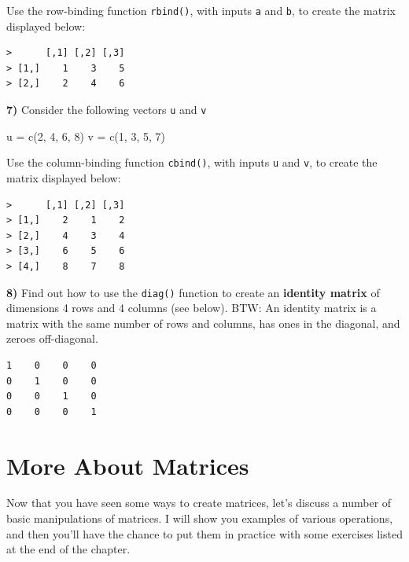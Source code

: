 \documentclass[
]{book}
\newenvironment{Shaded}{\begin{snugshade}}{\end{snugshade}}
\newcommand{\DecValTok}[1]{\textcolor[rgb]{0.00,0.00,0.81}{#1}}
\newcommand{\FunctionTok}[1]{\textcolor[rgb]{0.00,0.00,0.00}{#1}}
\newcommand{\NormalTok}[1]{#1}
\newcommand{\OtherTok}[1]{\textcolor[rgb]{0.56,0.35,0.01}{#1}}
\begin{document}
Use the row-binding function \texttt{rbind()}, with inputs \texttt{a} and \texttt{b}, to create the
matrix displayed below:

\begin{verbatim}
>      [,1] [,2] [,3]
> [1,]    1    3    5
> [2,]    2    4    6
\end{verbatim}

\textbf{7)} Consider the following vectors \texttt{u} and \texttt{v}

\begin{Shaded}
\begin{Highlighting}[]
\NormalTok{u }\OtherTok{=} \FunctionTok{c}\NormalTok{(}\DecValTok{2}\NormalTok{, }\DecValTok{4}\NormalTok{, }\DecValTok{6}\NormalTok{, }\DecValTok{8}\NormalTok{)}
\NormalTok{v }\OtherTok{=} \FunctionTok{c}\NormalTok{(}\DecValTok{1}\NormalTok{, }\DecValTok{3}\NormalTok{, }\DecValTok{5}\NormalTok{, }\DecValTok{7}\NormalTok{)}
\end{Highlighting}
\end{Shaded}

Use the column-binding function \texttt{cbind()}, with inputs \texttt{u} and \texttt{v}, to create
the matrix displayed below:

\begin{verbatim}
>      [,1] [,2] [,3]
> [1,]    2    1    2
> [2,]    4    3    4
> [3,]    6    5    6
> [4,]    8    7    8
\end{verbatim}

\textbf{8)} Find out how to use the \texttt{diag()} function to create an \textbf{identity matrix}
of dimensions 4 rows and 4 columns (see below). BTW: An identity matrix is a
matrix with the same number of rows and columns, has ones in the diagonal,
and zeroes off-diagonal.

\begin{verbatim}
1    0    0    0
0    1    0    0
0    0    1    0
0    0    0    1
\end{verbatim}

\hypertarget{matrices2}{%
\chapter{More About Matrices}\label{matrices2}}

Now that you have seen some ways to create matrices, let's discuss a number
of basic manipulations of matrices. I will show you examples of various
operations, and then you'll have the chance to put them in practice with some
exercises listed at the end of the chapter.
\end{document}
